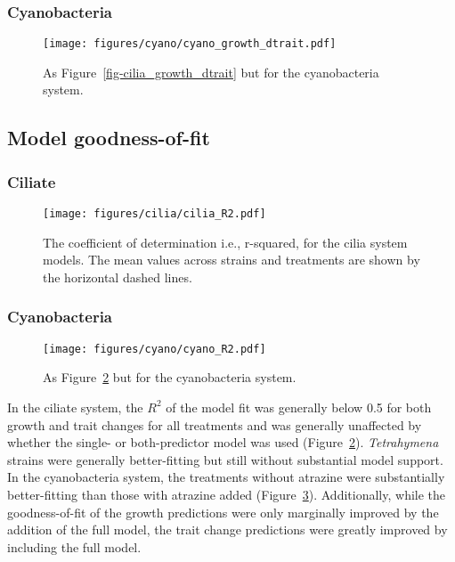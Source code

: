 \documentclass[
  letterpaper,
  DIV=11,
  numbers=noendperiod]{scrartcl}
\begin{document}
\subsubsection{Cyanobacteria}\label{cyanobacteria-4}

\begin{figure}

{\centering \texttt{[image: figures/cyano/cyano\_growth\_dtrait.pdf]}

}

\caption{\label{fig-cyano_growth_dtrait}As
Figure~\ref{fig-cilia_growth_dtrait} but for the cyanobacteria system.}

\end{figure}

\subsection{Model goodness-of-fit}\label{model-goodness-of-fit}

\subsubsection{Ciliate}\label{ciliate-5}

\begin{figure}

{\centering \texttt{[image: figures/cilia/cilia\_R2.pdf]}

}

\caption{\label{fig-cilia_R2}The coefficient of determination i.e.,
r-squared, for the cilia system models. The mean values across strains
and treatments are shown by the horizontal dashed lines.}

\end{figure}

\subsubsection{Cyanobacteria}\label{cyanobacteria-5}

\begin{figure}

{\centering \texttt{[image: figures/cyano/cyano\_R2.pdf]}

}

\caption{\label{fig-cyano_R2}As Figure~\ref{fig-cilia_R2} but for the
cyanobacteria system.}

\end{figure}

In the ciliate system, the \(R^2\) of the model fit was generally below
0.5 for both growth and trait changes for all treatments and was
generally unaffected by whether the single- or both-predictor model was
used (Figure~\ref{fig-cilia_R2}). \emph{Tetrahymena} strains were
generally better-fitting but still without substantial model support. In
the cyanobacteria system, the treatments without atrazine were
substantially better-fitting than those with atrazine added
(Figure~\ref{fig-cyano_R2}). Additionally, while the goodness-of-fit of
the growth predictions were only marginally improved by the addition of
the full model, the trait change predictions were greatly improved by
including the full model.
\end{document}
